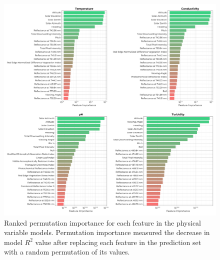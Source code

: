 \documentclass[remotesensing,article,submit,pdftex,moreauthors]{Definitions/mdpi}
\begin{document}
\begin{figure}[t!]
\centering
\vspace{-0.3in}
\includegraphics[width=\columnwidth]{paper/figures/results/fits/physical-ranking.pdf}
\vspace{-0.2in}
\caption{Ranked permutation importance for each feature in the physical variable models. Permutation importance measured the decrease in model $R^2$ value after replacing each feature in the prediction set with a random permutation of its values.\label{fig:physical-fi}}
\end{figure}  
\end{document}
